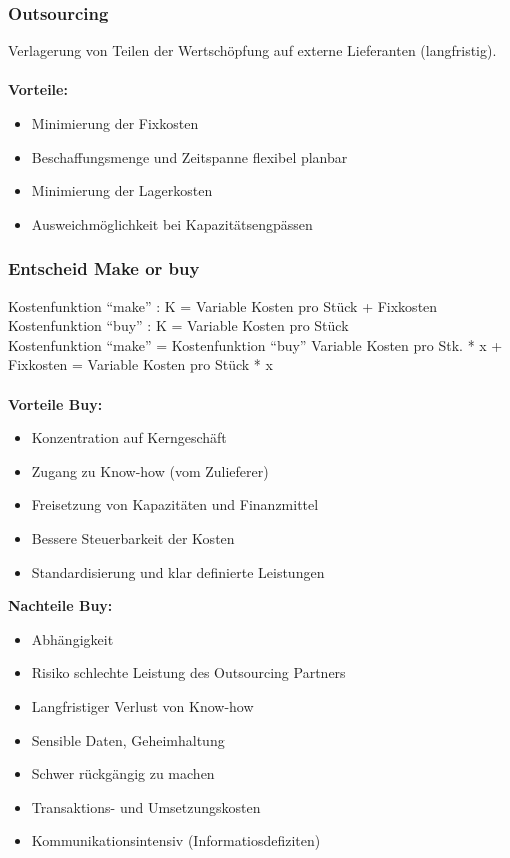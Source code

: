 \documentclass[../ZF_Wing.tex]{subfiles}
\begin{document}
\subsubsection{Outsourcing}
Verlagerung von Teilen der Wertschöpfung auf externe Lieferanten (langfristig).\\\\
\textbf{Vorteile:}
\begin{itemize}
	\item Minimierung der Fixkosten
	\item Beschaffungsmenge und Zeitspanne flexibel planbar
	\item Minimierung der Lagerkosten
	\item Ausweichmöglichkeit bei Kapazitätsengpässen
\end{itemize}

\subsubsection{Entscheid Make or buy}

Kostenfunktion ``make'' : \colorbox {teal!30} {K = Variable Kosten pro Stück + Fixkosten}\\
Kostenfunktion ``buy''  : \colorbox {teal!30} {K = Variable Kosten pro Stück}\\
Kostenfunktion ``make'' = Kostenfunktion ``buy''
Variable Kosten pro Stk. * x + Fixkosten = Variable Kosten pro Stück * x\\\\
\textbf{Vorteile Buy:}
\begin{itemize}
	\item Konzentration auf Kerngeschäft
	\item Zugang zu Know-how (vom Zulieferer)
	\item Freisetzung von Kapazitäten und Finanzmittel
	\item Bessere Steuerbarkeit der Kosten
	\item Standardisierung und klar definierte Leistungen
\end{itemize}
\textbf{Nachteile Buy:}
\begin{itemize}
	\item Abhängigkeit
	\item Risiko schlechte Leistung des Outsourcing Partners
	\item Langfristiger Verlust von Know-how
	\item Sensible Daten, Geheimhaltung
	\item Schwer rückgängig zu machen
	\item Transaktions- und Umsetzungskosten
	\item Kommunikationsintensiv (Informatiosdefiziten)
\end{itemize}
\end{document}
